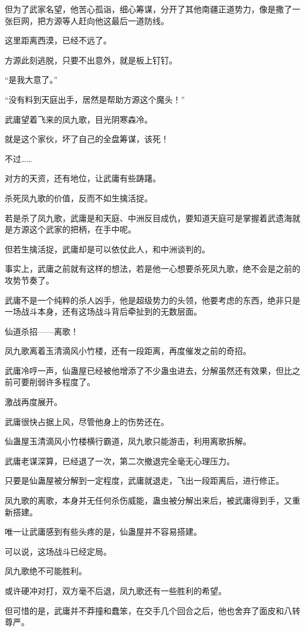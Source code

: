 \begin{this_body}
但为了武家名望，他苦心孤诣，细心筹谋，分开了其他南疆正道势力，像是撒了一张巨网，把方源等人赶向他这最后一道防线。

这里距离西漠，已经不远了。

方源此刻逃脱，只要不出意外，就是板上钉钉。

“是我大意了。”

“没有料到天庭出手，居然是帮助方源这个魔头！”

武庸望着飞来的凤九歌，目光阴寒森冷。

就是这个家伙，坏了自己的全盘筹谋，该死！

不过……

对方的天资，还有地位，让武庸有些踌躇。

杀死凤九歌的价值，反而不如生擒活捉。

若是杀了凤九歌，武庸是和天庭、中洲反目成仇，要知道天庭可是掌握着武遗海就是方源这个武家的把柄，在手中呢。

但若生擒活捉，武庸却是可以依仗此人，和中洲谈判的。

事实上，武庸之前就有这样的想法，若是他一心想要杀死凤九歌，绝不会是之前的攻势节奏了。

武庸不是一个纯粹的杀人凶手，他是超级势力的头领，他要考虑的东西，绝非只是一场战斗本身，还有这场战斗背后牵扯到的无数层面。

仙道杀招——离歌！

凤九歌离着玉清滴风小竹楼，还有一段距离，再度催发之前的奇招。

武庸冷哼一声，仙蛊屋已经被他增添了不少蛊虫进去，分解虽然还有效果，但比之前可要削弱许多程度了。

激战再度展开。

武庸很快占据上风，尽管他身上的伤势还在。

仙蛊屋玉清滴风小竹楼横行霸道，凤九歌只能游击，利用离歌拆解。

武庸老谋深算，已经退了一次，第二次撤退完全毫无心理压力。

只要是仙蛊屋被分解到一定程度，武庸就退走，飞出一段距离后，进行修正。

凤九歌的离歌，本身并无任何杀伤威能，蛊虫被分解出来后，被武庸得到手，又重新搭建。

唯一让武庸感到有些头疼的是，仙蛊屋并不容易搭建。

可以说，这场战斗已经定局。

凤九歌绝不可能胜利。

或许硬冲对打，双方毫不后退，凤九歌还有一些胜利的希望。

但可惜的是，武庸并不莽撞和蠢笨，在交手几个回合之后，他也舍弃了面皮和八转尊严。


\end{this_body}
